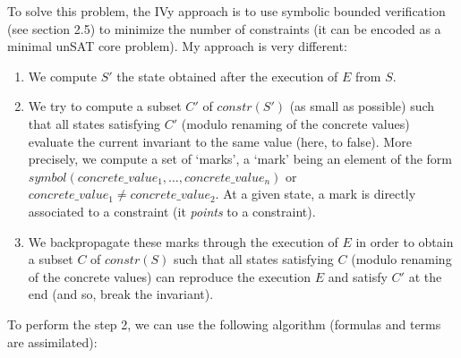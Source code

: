 \documentclass[11pt,a4paper,oldfontcommands,openany]{memoir}
\begin{document}
    To solve this problem, the IVy approach is to use symbolic bounded verification (see section 2.5) to minimize the number of constraints (it can be encoded as a minimal unSAT core problem).
    My approach is very different:
    \begin{enumerate}
        \item We compute \(S'\) the state obtained after the execution of \(E\) from \(S\).
        \item We try to compute a subset \(C'\) of \(constr(S')\) (as small as possible) such that all states satisfying \(C'\) (modulo renaming of the concrete values)
        evaluate the current invariant to the same value (here, to false). More precisely, we compute a set of `marks', a `mark' being an element of the form \(symbol(concrete\_value_1,\ldots,concrete\_value_n)\) or \(concrete\_value_1 \neq concrete\_value_2\).
        At a given state, a mark is directly associated to a constraint (it \textit{points} to a constraint).
        \item We backpropagate these marks through the execution of \(E\) in order to obtain a subset \(C\) of \(constr(S)\) such that
        all states satisfying \(C\) (modulo renaming of the concrete values) can reproduce the execution \(E\) and satisfy \(C'\) at the end (and so, break the invariant).
    \end{enumerate}

    To perform the step 2, we can use the following algorithm (formulas and terms are assimilated):
\end{document}
